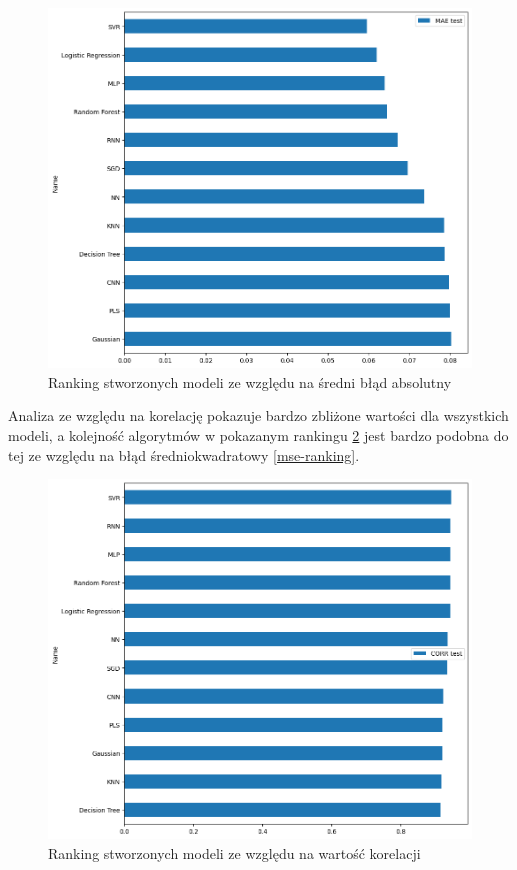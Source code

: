\begin{figure}[H]
    \centering
    \includegraphics[width=\textwidth]{images/mae_ranking.png}
    \caption{Ranking stworzonych modeli ze względu na średni błąd absolutny}
    \label{mae-ranking}
\end{figure}

Analiza ze względu na korelację pokazuje bardzo zbliżone wartości dla wszystkich 
modeli, a kolejność algorytmów w pokazanym rankingu \ref{corr-ranking} jest 
bardzo podobna do tej ze względu na błąd średniokwadratowy \ref{mse-ranking}.

\begin{figure}[H]
    \centering
    \includegraphics[width=\textwidth]{images/corr_ranking.png}
    \caption{Ranking stworzonych modeli ze względu na wartość korelacji}
    \label{corr-ranking}
\end{figure}

